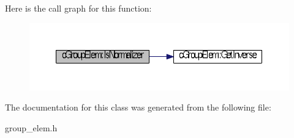\-Here is the call graph for this function\-:\nopagebreak
\begin{figure}[H]
\begin{center}
\leavevmode
\includegraphics[width=350pt]{classcGroupElem_ab01a807aff26daecd39cea6837b01e8e_cgraph}
\end{center}
\end{figure}




\-The documentation for this class was generated from the following file\-:\begin{DoxyCompactItemize}
\item 
group\-\_\-elem.\-h\end{DoxyCompactItemize}
